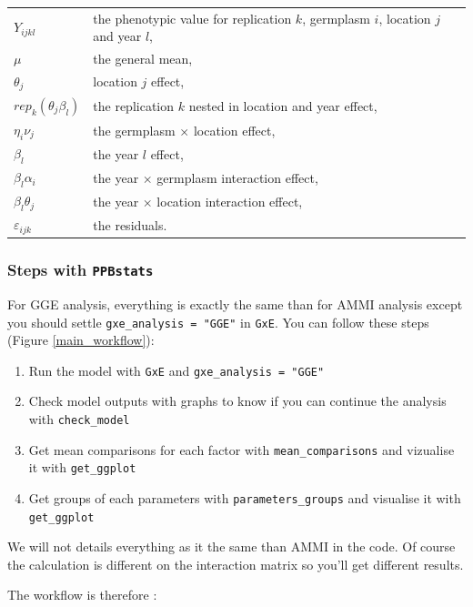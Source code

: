 \documentclass{book}\usepackage[]{graphicx}\usepackage[]{color}
\newcommand{\pack}{\texttt{PPBstats}}
\begin{document}
\begin{tabular}{ll}
$Y_{ijkl}$ & the phenotypic value for replication $k$, germplasm $i$, location $j$ and year $l$, \\
$\mu$ & the general mean, \\
$\theta_{j}$ & location $j$ effect, \\
$rep_{k}(\theta_{j}\beta_{l})$ & the replication $k$ nested in location and year effect, \\
$\eta_{i}\nu_{j}$ & the germplasm $\times$ location effect, \\
$\beta_{l}$ & the year $l$ effect, \\
$\beta_{l}\alpha_{i}$ & the year $\times$ germplasm interaction effect, \\
$\beta_{l}\theta_{j}$ & the year $\times$ location interaction effect, \\
$\varepsilon_{ijk}$ & the residuals.\\
\end{tabular}


\subsubsection{Steps with \pack}


For GGE analysis, everything is exactly the same than for AMMI analysis except you should settle \texttt{gxe\_analysis = "GGE"} in \texttt{GxE}.
You can follow these steps (Figure \ref{main_workflow}):

\begin{enumerate}
\item Run the model with \texttt{GxE} and \texttt{gxe\_analysis = "GGE"}
\item Check model outputs with graphs to know if you can continue the analysis with \texttt{check\_model}
\item Get mean comparisons for each factor with \texttt{mean\_comparisons} and vizualise it with \texttt{get\_ggplot}
\item Get groups of each parameters with \texttt{parameters\_groups} and visualise it with \texttt{get\_ggplot}
\end{enumerate}

We will not details everything as it the same than AMMI in the code.
Of course the calculation is different on the interaction matrix so you'll get different results.

The workflow is therefore :
\end{document}
